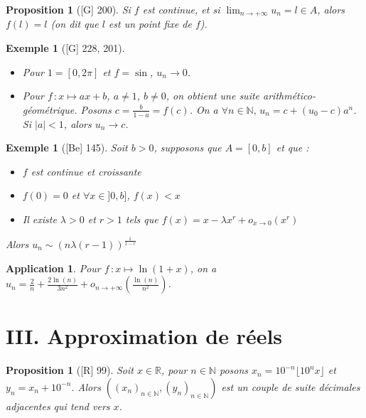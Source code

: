 \documentclass[10pt, a4paper, parskip=full, twoside, twocolumn]{report}
\newtheorem{proposition}[definition]{Proposition}
\newtheorem{example}[definition]{Exemple}
\newtheorem{application}[definition]{Application}
\newcommand{\IN}{\mathbb{N}}
\newcommand{\IR}{\mathbb{R}}
\begin{document}
\begin{proposition}[\textnormal{[G] 200}]
	Si $f$ est continue, et si $\displaystyle{\lim_{n\to +\infty} u_n =l \in A}$, alors $f(l) = l$ (on dit que $l$ est un \emph{point fixe de $f$}).
\end{proposition}

\begin{example}[\textnormal{[G] 228, 201}]
	\begin{itemize}
		\item Pour $1 = [0,2\pi]$ et $f = \sin$, $u_n \to 0$.
		\item Pour $f\,\colon x\mapsto ax+b$, $a\neq 1$, $b\neq 0$, on obtient une \emph{suite arithmético-géométrique}. Posons $c = \frac{b}{1-a} = f(c)$. On a $\forall n\in \IN,\, u_n = c + (u_0 - c)a^n$. Si $\vert a\vert < 1$, alors $u_n\to c$.
	\end{itemize}
\end{example}

\begin{tcolorbox}[
    breakable, %
    colback=developpement, %
    colframe=gray!0!black, %
    boxrule=0pt, %
    arc=1mm, %
	boxsep=0pt,
	left=0pt, right=0pt, top=0pt, bottom=0pt
]
\begin{example}[\textnormal{[Be] 145}]
	\label{223dev11}
	Soit $b > 0$, supposons que $A = [0,b]$ et que :
	\begin{itemize}
		\item $f$ est continue et croissante
		\item $f(0) = 0$ et $\forall x\in ]0,b]$, $f(x) < x$
		\item Il existe $\lambda >0$ et $r> 1$ tels que $f(x) = x - \lambda x^r + o_{x\to 0}(x^r)$
	\end{itemize}
	Alors $u_n \sim \left(n\lambda(r-1)\right)^{\frac{1}{1-r}}$
\end{example}

\begin{application}
	\label{223dev12}
	Pour $f\,\colon x\mapsto \ln(1+x)$, on a $u_n = \frac{2}{n} + \frac{2\ln(n)}{3n^2} + o_{n\to +\infty}(\frac{\ln(n)}{n^2})$.
\end{application}
\end{tcolorbox}

\section*{III. Approximation de réels}
\begin{proposition}[\textnormal{[R] 99}]
	Soit $x\in\IR$, pour $n\in\IN$ posons $x_n = 10^{-n}\lfloor 10^nx\rfloor$ et $y_n = x_n + 10^{-n}$.
	Alors $\left(\left(x_n\right)_{n\in\IN}, \left(y_n\right)_{n\in\IN}\right)$ est un couple de suite décimales adjacentes qui tend vers $x$.
\end{proposition}
\end{document}
